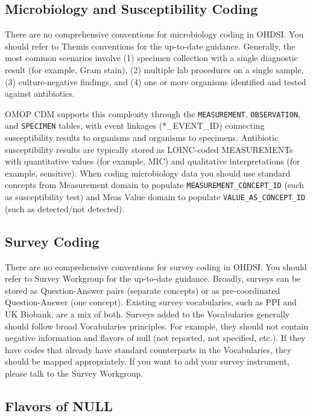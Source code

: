 \documentclass[
  letterpaper,
  paper=7in:10in,
  pagesize=pdftex,
  headinclude=on,
  footinclude=on,
  12pt]{scrbook}
\begin{document}
\subsection{Microbiology and Susceptibility
Coding}\label{microbiology-and-susceptibility-coding}

There are no comprehensive conventions for microbiology coding in OHDSI.
You should refer to Themis conventions for the up-to-date guidance.
Generally, the most common scenarios involve (1) specimen collection
with a single diagnostic result (for example, Gram stain), (2) multiple
lab procedures on a single sample, (3) culture-negative findings, and
(4) one or more organisms identified and tested against antibiotics.

OMOP CDM supports this complexity through the \texttt{MEASUREMENT},
\texttt{OBSERVATION}, and \texttt{SPECIMEN} tables, with event linkages
(*\_EVENT\_ID) connecting susceptibility results to organisms and
organisms to specimens. Antibiotic susceptibility results are typically
stored as LOINC-coded MEASUREMENTs with quantitative values (for
example, MIC) and qualitative interpretations (for example, sensitive).
When coding microbiology data you should use standard concepts from
Measurement domain to populate \texttt{MEASUREMENT\_CONCEPT\_ID} (such
as susceptibility test) and Meas Value domain to populate
\texttt{VALUE\_AS\_CONCEPT\_ID} (such as detected/not detected).

\subsection{Survey Coding}\label{survey-coding}

There are no comprehensive conventions for survey coding in OHDSI. You
should refer to Survey Workgroup for the up-to-date guidance. Broadly,
surveys can be stored as Question-Answer pairs (separate concepts) or as
pre-coordinated Question-Answer (one concept). Existing survey
vocabularies, such as PPI and UK Biobank, are a mix of both. Surveys
added to the Vocabularies generally should follow broad Vocabularies
principles. For example, they should not contain negative information
and flavors of null (not reported, not specified, etc.). If they have
codes that already have standard counterparts in the Vocabularies, they
should be mapped appropriately. If you want to add your survey
instrument, please talk to the Survey Workgroup.

\subsection{Flavors of NULL}\label{flavors-of-null}
\end{document}
